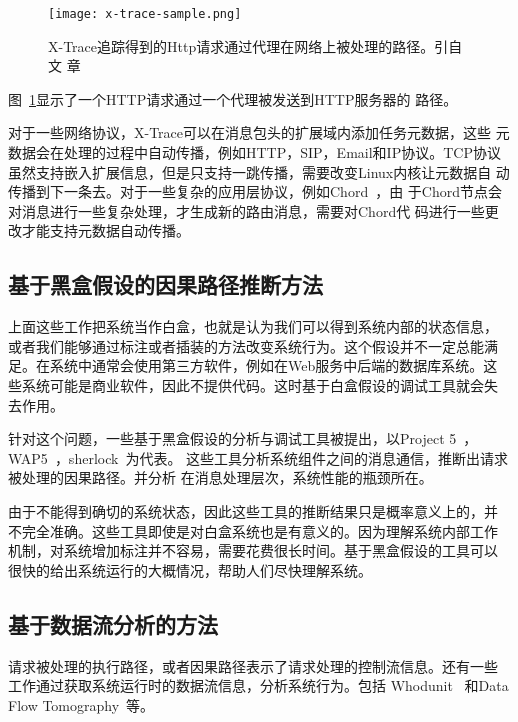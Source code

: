 \begin{figure}
\centering
\begin{minipage}{0.8\linewidth}
\texttt{[image: x-trace-sample.png]}
\caption{X-Trace追踪得到的Http请求通过代理在网络上被处理的路径。引自文
章~\cite{x-trace}}
\label{fig:x-trace}
\end{minipage}
\end{figure}

图~\ref{fig:x-trace}显示了一个HTTP请求通过一个代理被发送到HTTP服务器的
路径。

对于一些网络协议，X-Trace可以在消息包头的扩展域内添加任务元数据，这些
元数据会在处理的过程中自动传播，例如HTTP，SIP，Email和IP协议。TCP协议
虽然支持嵌入扩展信息，但是只支持一跳传播，需要改变Linux内核让元数据自
动传播到下一条去。对于一些复杂的应用层协议，例如Chord~\cite{chord}，由
于Chord节点会对消息进行一些复杂处理，才生成新的路由消息，需要对Chord代
码进行一些更改才能支持元数据自动传播。

\subsection{基于黑盒假设的因果路径推断方法}
\label{related:debug:inference}

上面这些工作把系统当作白盒，也就是认为我们可以得到系统内部的状态信息，
或者我们能够通过标注或者插装的方法改变系统行为。这个假设并不一定总能满
足。在系统中通常会使用第三方软件，例如在Web服务中后端的数据库系统。这
些系统可能是商业软件，因此不提供代码。这时基于白盒假设的调试工具就会失
去作用。

针对这个问题，一些基于黑盒假设的分析与调试工具被提出，以Project
5~\cite{project5}，WAP5~\cite{wap5}，sherlock~\cite{sherlock}为代表。
这些工具分析系统组件之间的消息通信，推断出请求被处理的因果路径。并分析
在消息处理层次，系统性能的瓶颈所在。

由于不能得到确切的系统状态，因此这些工具的推断结果只是概率意义上的，并
不完全准确。这些工具即使是对白盒系统也是有意义的。因为理解系统内部工作
机制，对系统增加标注并不容易，需要花费很长时间。基于黑盒假设的工具可以
很快的给出系统运行的大概情况，帮助人们尽快理解系统。

\subsection{基于数据流分析的方法}
\label{related:debug:dataflow}

请求被处理的执行路径，或者因果路径表示了请求处理的控制流信息。还有一些
工作通过获取系统运行时的数据流信息，分析系统行为。包括
Whodunit~\cite{whodunit} 和Data Flow Tomography~\cite{dft}等。

